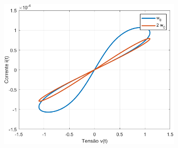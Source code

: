 \documentclass{ceel}
\begin{document}
\begin{multicols}{2}
\begin{figure}[ht]
\begin{subfigure}{0.33\textwidth}
\caption{} \label{vt:xt}
\end{subfigure}
\hfill
\begin{subfigure}{0.33\textwidth}
\centering
\includegraphics[width=\columnwidth]{ww0}
\caption{} \label{pinched}
\end{subfigure}


\end{figure}
\end{multicols}
\end{document}

